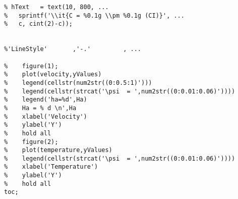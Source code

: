 \begin{lstlisting}
% hText   = text(10, 800, ...
%   sprintf('\\it{C = %0.1g \\pm %0.1g (CI)}', ...
%   c, cint(2)-c));


%'LineStyle'       ,'-.'         , ...

%    figure(1);
%    plot(velocity,yValues)
%    legend(cellstr(num2str((0:0.5:1)')))
%    legend(cellstr(strcat('\psi  = ',num2str((0:0.01:0.06)'))))
%    legend('ha=%d',Ha)
%    Ha = % d \n',Ha
%    xlabel('Velocity')
%    ylabel('Y')
%    hold all
%    figure(2);
%    plot(temperature,yValues)
%    legend(cellstr(strcat('\psi  = ',num2str((0:0.01:0.06)'))))
%    xlabel('Temperature')
%    ylabel('Y')
%    hold all
toc;

 \end{lstlisting}
 
